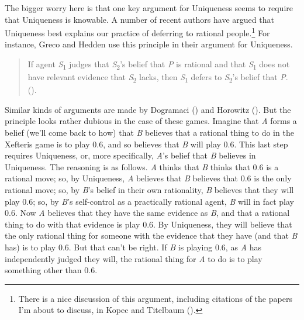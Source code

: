 \documentclass[
  12pt,
  letterpaper,
  DIV=11,
  numbers=noendperiod]{scrreprt}
\begin{document}
The bigger worry here is that one key argument for Uniqueness seems to
require that Uniqueness is knowable. A number of recent authors have
argued that Uniqueness best explains our practice of deferring to
rational people.\footnote{There is a nice discussion of this argument,
  including citations of the papers I'm about to discuss, in Kopec and
  Titelbaum ().} For
instance, Greco and Hedden use this principle in their argument for
Uniqueness.

\begin{quote}
If agent \emph{S}\textsubscript{1} judges that
\emph{S}\textsubscript{2}'s belief that \emph{P} is rational and that
\emph{S}\textsubscript{1} does not have relevant evidence that
\emph{S}\textsubscript{2} lacks, then \emph{S}\textsubscript{1} defers
to \emph{S}\textsubscript{2}'s belief that \emph{P}.
().
\end{quote}

Similar kinds of arguments are made by Dogramaci
() and Horowitz
(). But the principle looks rather
dubious in the case of these games. Imagine that \emph{A} forms a belief
(we'll come back to how) that \emph{B} believes that a rational thing to
do in the Xefteris game is to play 0.6, and so believes that \emph{B}
will play 0.6. This last step requires Uniqueness, or, more
specifically, \emph{A}'s belief that \emph{B} believes in Uniqueness.
The reasoning is as follows. \emph{A} thinks that \emph{B} thinks that
0.6 is a rational move; so, by Uniqueness, \emph{A} believes that
\emph{B} believes that 0.6 is the only rational move; so, by \emph{B}'s
belief in their own rationality, \emph{B} believes that they will play
0.6; so, by \emph{B}'s self-control as a practically rational agent,
\emph{B} will in fact play 0.6. Now \emph{A} believes that they have the
same evidence as \emph{B}, and that a rational thing to do with that
evidence is play 0.6. By Uniqueness, they will believe that the only
rational thing for someone with the evidence that they have (and that
\emph{B} has) is to play 0.6. But that can't be right. If \emph{B} is
playing 0.6, as \emph{A} has independently judged they will, the
rational thing for \emph{A} to do is to play something other than 0.6.
\end{document}
